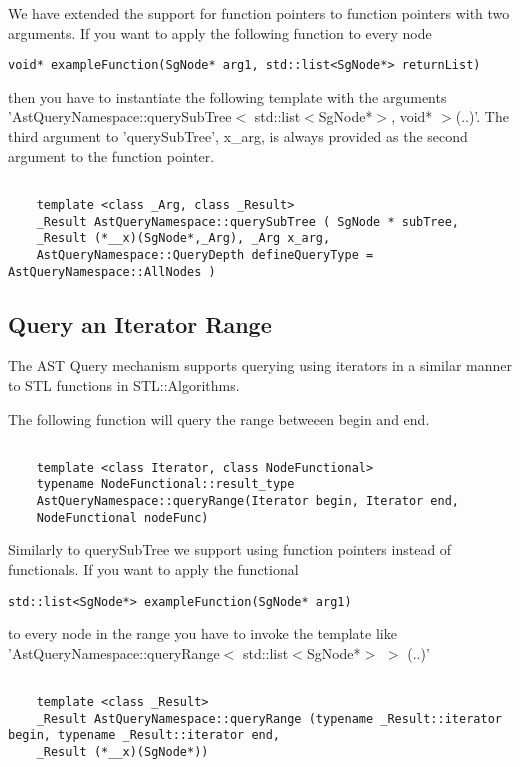 We have extended the support for function pointers to function pointers with two arguments. If you want to apply the
following function to every node
\begin{verbatim}
void* exampleFunction(SgNode* arg1, std::list<SgNode*> returnList) 
\end{verbatim}
then you have to instantiate the following template with the arguments 'AstQueryNamespace::querySubTree$<$ std::list$<$SgNode*$>$, void* $>$(..)'.
The third argument to 'querySubTree', x\_arg, is always provided as the second argument to the function pointer.
\begin{verbatim}

    template <class _Arg, class _Result> 
    _Result AstQueryNamespace::querySubTree ( SgNode * subTree,
	_Result (*__x)(SgNode*,_Arg), _Arg x_arg,
	AstQueryNamespace::QueryDepth defineQueryType = AstQueryNamespace::AllNodes )
\end{verbatim}




\subsection{Query an Iterator Range}

The AST Query mechanism supports querying using iterators in a similar manner to STL functions in STL::Algorithms.

The following function will query the range betweeen begin and end.
\begin{verbatim}

    template <class Iterator, class NodeFunctional>
    typename NodeFunctional::result_type 
    AstQueryNamespace::queryRange(Iterator begin, Iterator end, 
	NodeFunctional nodeFunc)
\end{verbatim}

Similarly to querySubTree we support using function pointers instead of functionals. If you want to apply the
functional
\begin{verbatim}
std::list<SgNode*> exampleFunction(SgNode* arg1) 
\end{verbatim}
to every node in the range you have to invoke the template like 'AstQueryNamespace::queryRange$<$ std::list$<$SgNode*$>$ $>$ (..)'

\begin{verbatim}

    template <class _Result> 
    _Result AstQueryNamespace::queryRange (typename _Result::iterator begin, typename _Result::iterator end,
	_Result (*__x)(SgNode*))
\end{verbatim}

